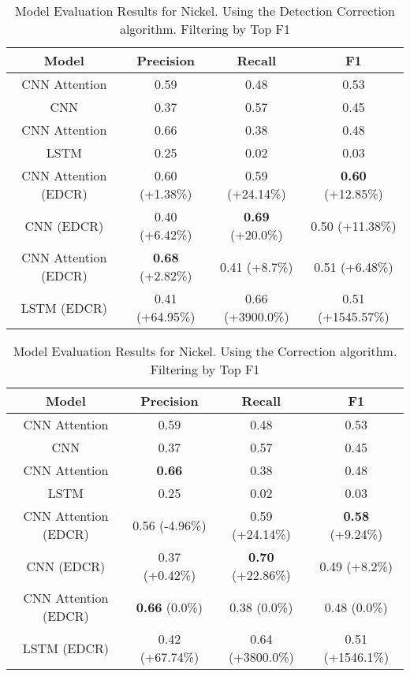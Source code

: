 \begin{table}
\centering
\begin{tabular}{|c|c|c|c|}
\hline
Model & Precision & Recall & F1\\
\hline
CNN Attention & 0.59 & 0.48 & 0.53\\
CNN  & 0.37 & 0.57 & 0.45\\
CNN Attention & 0.66 & 0.38 & 0.48\\
LSTM  & 0.25 & 0.02 & 0.03\\

\hline
CNN Attention (EDCR) & 0.60 (+1.38\%) & 0.59 (+24.14\%) & \textbf{0.60} (+12.85\%)\\
CNN  (EDCR) & 0.40 (+6.42\%) & \textbf{0.69} (+20.0\%) & 0.50 (+11.38\%)\\
CNN Attention (EDCR) & \textbf{0.68} (+2.82\%) & 0.41 (+8.7\%) & 0.51 (+6.48\%)\\
LSTM  (EDCR) & 0.41 (+64.95\%) & 0.66 (+3900.0\%) & 0.51 (+1545.57\%)\\

\hline
\end{tabular}
\caption{Model Evaluation Results for Nickel. Using the Detection Correction algorithm. Filtering by Top F1}
\end{table}
\begin{table}
\centering
\begin{tabular}{|c|c|c|c|}
\hline
Model & Precision & Recall & F1\\
\hline
CNN Attention & 0.59 & 0.48 & 0.53\\
CNN  & 0.37 & 0.57 & 0.45\\
CNN Attention & \textbf{0.66} & 0.38 & 0.48\\
LSTM  & 0.25 & 0.02 & 0.03\\

\hline
CNN Attention (EDCR) & 0.56 (-4.96\%) & 0.59 (+24.14\%) & \textbf{0.58} (+9.24\%)\\
CNN  (EDCR) & 0.37 (+0.42\%) & \textbf{0.70} (+22.86\%) & 0.49 (+8.2\%)\\
CNN Attention (EDCR) & \textbf{0.66} (0.0\%) & 0.38 (0.0\%) & 0.48 (0.0\%)\\
LSTM  (EDCR) & 0.42 (+67.74\%) & 0.64 (+3800.0\%) & 0.51 (+1546.1\%)\\

\hline
\end{tabular}
\caption{Model Evaluation Results for Nickel. Using the Correction algorithm. Filtering by Top F1}
\end{table}
